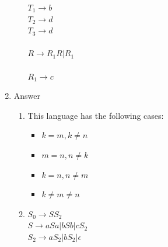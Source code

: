 \documentclass{article}
\begin{document}
\begin{enumerate}
\begin{enumerate}
				$T_1 \rightarrow b$\\ $T_2 \rightarrow d$\\$T_3 \rightarrow d$\\\\

				$R \rightarrow R_1R | R_1$\\\\
				$R_1 \rightarrow c$\\
			\end{enumerate}
		\item Answer \begin{enumerate}
			\item This language has the following cases:
				\begin{itemize}
					\item$k=m, k \neq n$
					\item$m=n, n \neq k$
					\item$k=n, n \neq m$
					\item$k \neq m \neq n$
				\end{itemize}
			\item $S_0 \rightarrow SS_2$\\
				$S \rightarrow aSa | bSb | cS_2$\\
				$S_2 \rightarrow aS_2 | bS_2 | \epsilon$\\
		\end{enumerate}
	\end{enumerate}
\end{document}
